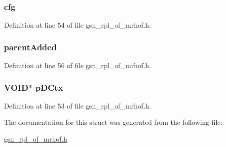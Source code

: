 \hypertarget{a00205_ac5c3a52ba6b2f31c767761f1f942593b}{
\subsubsection[{cfg}]{ {\bf cfg}}}
\label{a00205_ac5c3a52ba6b2f31c767761f1f942593b}


Definition at line 54 of file gsn\_\-rpl\_\-of\_\-mrhof.h.

\hypertarget{a00205_a67f0be3ccd18b6a197bbd42a009fd79d}{
\subsubsection[{parentAdded}]{ {\bf parentAdded}}}
\label{a00205_a67f0be3ccd18b6a197bbd42a009fd79d}


Definition at line 56 of file gsn\_\-rpl\_\-of\_\-mrhof.h.

\hypertarget{a00205_a3253e84cda227e6b191e0d46bf38ed3c}{
\subsubsection[{pDCtx}]{\setlength{\rightskip}{0pt plus 5cm}VOID$\ast$ {\bf pDCtx}}}
\label{a00205_a3253e84cda227e6b191e0d46bf38ed3c}


Definition at line 53 of file gsn\_\-rpl\_\-of\_\-mrhof.h.



The documentation for this struct was generated from the following file:\begin{DoxyCompactItemize}
\item 
\hyperlink{a00581}{gsn\_\-rpl\_\-of\_\-mrhof.h}\end{DoxyCompactItemize}
